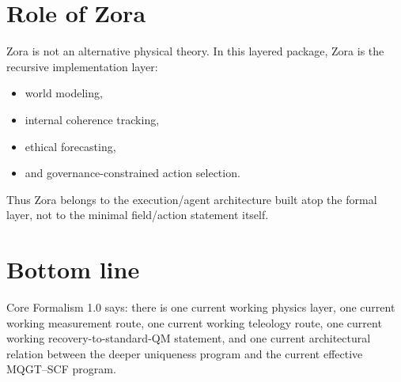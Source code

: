 \documentclass[reprint,amsmath,amssymb,aps,showkeys]{revtex4-2}
\begin{document}
\section*{Role of Zora}
Zora is not an alternative physical theory. In this layered package, Zora is the recursive implementation layer:
\begin{itemize}
    \item world modeling,
    \item internal coherence tracking,
    \item ethical forecasting,
    \item and governance-constrained action selection.
\end{itemize}
Thus Zora belongs to the execution/agent architecture built atop the formal layer, not to the minimal field/action statement itself.

\section*{Bottom line}
Core Formalism 1.0 says: there is one current working physics layer, one current working measurement route, one current working teleology route, one current working recovery-to-standard-QM statement, and one current architectural relation between the deeper uniqueness program and the current effective MQGT--SCF program.
\end{document}
